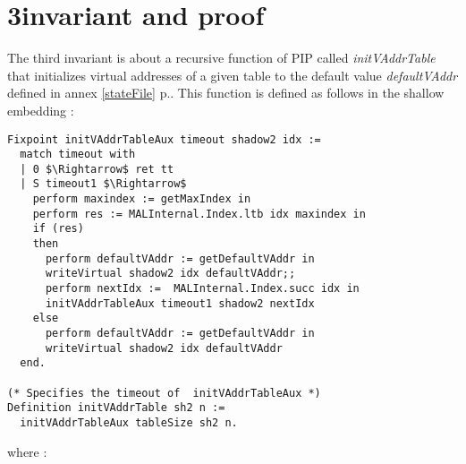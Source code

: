 \section{3\rd invariant and proof} \label{proof3}
The third invariant is about a recursive function of PIP called \textit{initVAddrTable} that initializes virtual addresses of a given table to the default value \textit{defaultVAddr} defined in annex \ref{stateFile} p.\pageref{stateFile}. This function is defined as follows in the shallow embedding : 
\begin{lstlisting}[caption = {initVAddrTable in the shallow embedding}, xleftmargin=-.02\textwidth,
xrightmargin=-.02\textwidth,mathescape=true]
Fixpoint initVAddrTableAux timeout shadow2 idx :=
  match timeout with
  | 0 $\Rightarrow$ ret tt
  | S timeout1 $\Rightarrow$
    perform maxindex := getMaxIndex in
    perform res := MALInternal.Index.ltb idx maxindex in
    if (res)
    then
      perform defaultVAddr := getDefaultVAddr in
      writeVirtual shadow2 idx defaultVAddr;;
      perform nextIdx :=  MALInternal.Index.succ idx in
      initVAddrTableAux timeout1 shadow2 nextIdx
    else  
      perform defaultVAddr := getDefaultVAddr in
      writeVirtual shadow2 idx defaultVAddr
  end.

(* Specifies the timeout of  initVAddrTableAux *) 
Definition initVAddrTable sh2 n :=
  initVAddrTableAux tableSize sh2 n.
\end{lstlisting} \vspace{4pt}
where :
